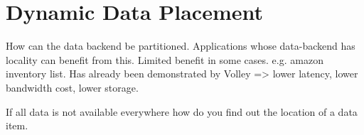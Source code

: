 %



\section{Dynamic Data Placement}

How can the data backend be partitioned.
Applications whose data-backend has locality can benefit from this.
Limited benefit in some cases. e.g. amazon inventory list. 
Has already been demonstrated by Volley => lower latency, lower bandwidth cost, lower storage.

If all data is not available everywhere how do you find out the location of a data item.


%






%
%
%
%
%
%
%
%
